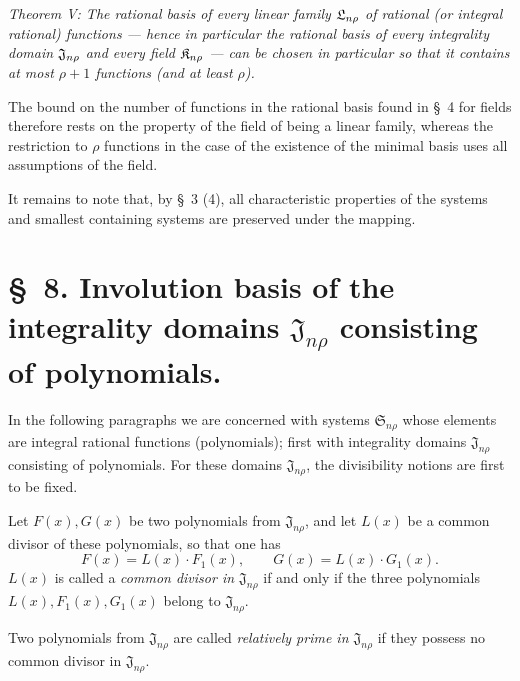 \documentclass[11pt]{article}
\providecommand{\eps}{\varepsilon}
\begin{document}
\emph{Theorem V: The rational basis of every linear family $\Lsys_{n\rho}$ of rational (or integral rational) functions --- hence in particular the rational basis of every integrality domain $\Jdom_{n\rho}$ and every field $\Kfield_{n\rho}$ --- can be chosen in particular so that it contains at most $\rho+1$ functions (and at least $\rho$).}

The bound on the number of functions in the rational basis found in \S\ 4 for fields therefore rests on the property of the field of being a linear family, whereas the restriction to $\rho$ functions in the case of the existence of the minimal basis uses all assumptions of the field.

It remains to note that, by \S\ 3 (4), all characteristic properties of the systems and smallest containing systems are preserved under the mapping.

\clearpage
\providecommand{\Kfield}{\mathfrak{K}}
\providecommand{\Ssys}{\mathfrak{S}}
\providecommand{\Jdom}{\mathfrak{J}}
\providecommand{\Gdom}{\mathfrak{G}}
\providecommand{\Lsys}{\mathfrak{L}}
\providecommand{\Omegaint}{[\Omega]}
\providecommand{\eps}{\varepsilon}

\providecommand{\Kfield}{\mathfrak{K}}
\providecommand{\Ssys}{\mathfrak{S}}
\providecommand{\Jdom}{\mathfrak{J}}
\providecommand{\Gdom}{\mathfrak{G}}
\providecommand{\Lsys}{\mathfrak{L}}
\providecommand{\Omegaint}{[\Omega]}
\providecommand{\eps}{\varepsilon}

\section*{\S\ 8. Involution basis of the integrality domains $\Jdom_{n\rho}$ consisting of polynomials.}

In the following paragraphs we are concerned with systems $\Ssys_{n\rho}$ whose elements are integral rational functions (polynomials); first with integrality domains $\Jdom_{n\rho}$ consisting of polynomials. For these domains $\Jdom_{n\rho}$, the divisibility notions are first to be fixed.

Let $F(x),G(x)$ be two polynomials from $\Jdom_{n\rho}$, and let $L(x)$ be a common divisor of these polynomials, so that one has
\[
  F(x)=L(x)\cdot F_1(x),\qquad G(x)=L(x)\cdot G_1(x).
\]
$L(x)$ is called a \emph{common divisor in $\Jdom_{n\rho}$} if and only if the three polynomials $L(x),F_1(x),G_1(x)$ belong to $\Jdom_{n\rho}$.

Two polynomials from $\Jdom_{n\rho}$ are called \emph{relatively prime in $\Jdom_{n\rho}$} if they possess no common divisor in $\Jdom_{n\rho}$.
\end{document}
